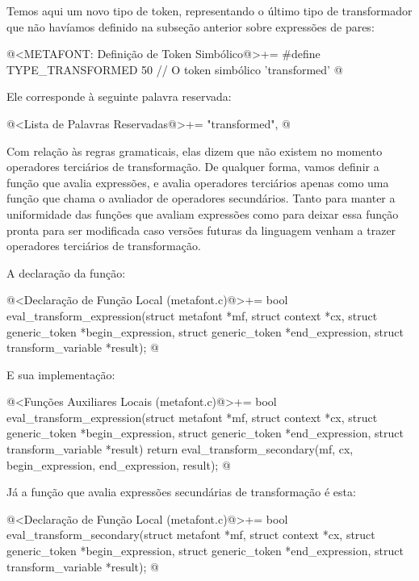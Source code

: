 Temos aqui um novo tipo de token, representando o último tipo de
transformador que não havíamos definido na subseção anterior sobre
expressões de pares:

\iniciocodigo
@<METAFONT: Definição de Token Simbólico@>+=
#define TYPE_TRANSFORMED  50 // O token simbólico 'transformed'
@
\fimcodigo

Ele corresponde à seguinte palavra reservada:

\iniciocodigo
@<Lista de Palavras Reservadas@>+=
"transformed",
@
\fimcodigo

Com relação às regras gramaticais, elas dizem que não existem no
momento operadores terciários de transformação. De qualquer forma,
vamos definir a função que avalia expressões, e avalia operadores
terciários apenas como uma função que chama o avaliador de operadores
secundários. Tanto para manter a uniformidade das funções que avaliam
expressões como para deixar essa função pronta para ser modificada
caso versões futuras da linguagem venham a trazer operadores
terciários de transformação.

A declaração da função:

\iniciocodigo
@<Declaração de Função Local (metafont.c)@>+=
bool eval_transform_expression(struct metafont *mf, struct context *cx,
                               struct generic_token *begin_expression,
                               struct generic_token *end_expression,
                               struct transform_variable *result);
@
\fimcodigo

E sua implementação:

\iniciocodigo
@<Funções Auxiliares Locais (metafont.c)@>+=
bool eval_transform_expression(struct metafont *mf, struct context *cx,
                               struct generic_token *begin_expression,
                               struct generic_token *end_expression,
                               struct transform_variable *result){
  return eval_transform_secondary(mf, cx, begin_expression, end_expression,
                                  result);
}
@
\fimcodigo

Já a função que avalia expressões secundárias de transformação é esta:

\iniciocodigo
@<Declaração de Função Local (metafont.c)@>+=
bool eval_transform_secondary(struct metafont *mf, struct context *cx,
                              struct generic_token *begin_expression,
                              struct generic_token *end_expression,
                              struct transform_variable *result);
@
\fimcodigo

